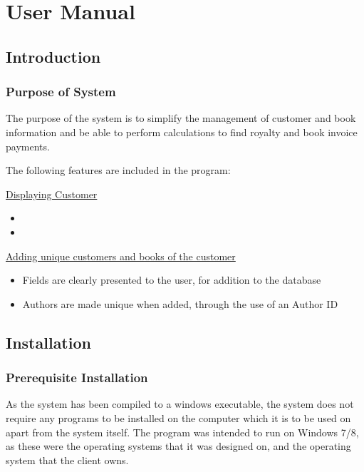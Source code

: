 \chapter{User Manual}

\tableofcontents
\startcontents[chapters]

\section{Introduction}

\subsection{Purpose of System}

The purpose of the system is to simplify the management of customer and book information and be able to perform calculations to find royalty and book invoice payments.

The following features are included in the program:

\underline{Displaying Customer}

\begin{itemize}
    \item 
    \item 
\end{itemize}


\underline{Adding unique customers and books of the customer}

\begin{itemize}
    \item Fields are clearly presented to the user, for addition to the database
    \item Authors are made unique when added, through the use of an Author ID
\end{itemize}


\section{Installation}

\subsection{Prerequisite Installation}

As the system has been compiled to a windows executable, the system does not require any programs to be installed on the computer which it is to be used on apart from the system itself. The program was intended to run on Windows 7/8, as these were the operating systems that it was designed on, and the operating system that the client owns.

